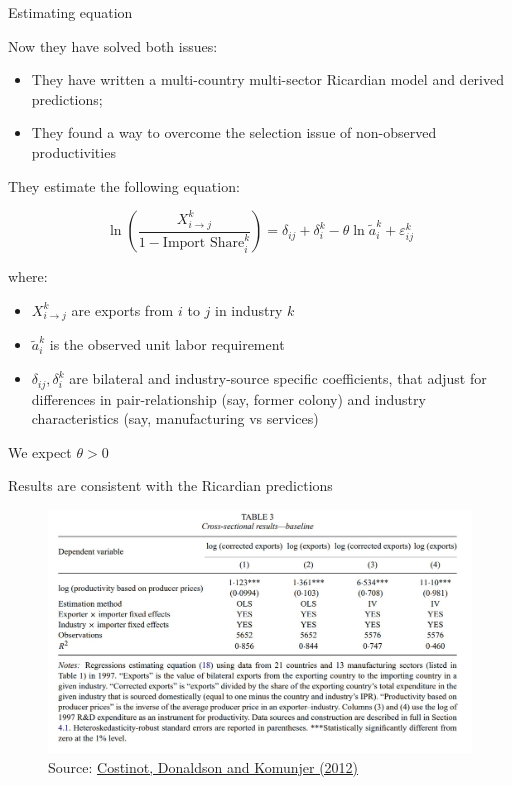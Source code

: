 \documentclass[notes,11pt, aspectratio=169, xcolor=table]{beamer}
\newenvironment{wideitemize}{\itemize\addtolength{\itemsep}{10pt}}{\enditemize}
\begin{document}
\begin{frame}{Estimating equation}
\begin{wideitemize}
    \item Now they have solved both issues:
    \begin{itemize}
        \item<2-> They have written a multi-country multi-sector Ricardian model and derived predictions; 
        \item<3-> They found a way to overcome the selection issue of non-observed productivities
    \end{itemize}
    \item<4-> They estimate the following equation:

    \begin{equation*}
    \ln \left( \frac{X_{i \to j}^k}{ 1-\text{Import Share}_i^k} \right) = \delta_{ij} + \delta^k_{i} - \theta \ln \tilde{a}_i^k + \varepsilon^k_{ij}
    \end{equation*}

    \noindent where:

    \begin{itemize}
        \item $X_{i \to j}^k$ are exports from $i$ to $j$ in industry $k$
        \item $\tilde{a}_i^k$ is the observed unit labor requirement
        \item $\delta_{ij}, \delta^k_{i}$ are bilateral and industry-source specific coefficients, that adjust for differences in pair-relationship (say, former colony) and industry characteristics (say, manufacturing vs services)
    \end{itemize}

    \item<5-> We expect $\theta > 0$
    
\end{wideitemize}

\end{frame}


\begin{frame}{Results are consistent with the Ricardian predictions}
    \begin{figure}
        \centering
        \includegraphics[width=0.6\linewidth]{figs/cdk1.jpg}
        \caption{Source: \href{https://academic.oup.com/restud/article/79/2/581/1532037}{Costinot, Donaldson and Komunjer (2012)} }
        \label{fig:cdk1}
    \end{figure}
\end{frame}
\end{document}
